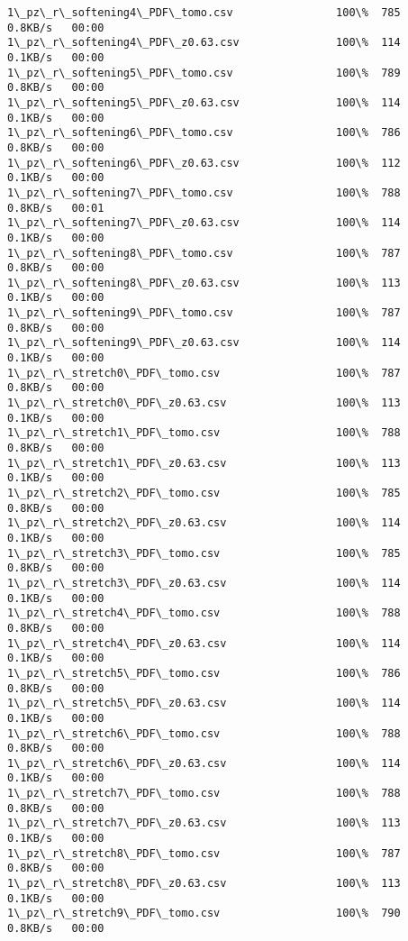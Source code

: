\documentclass[11pt]{article}
\begin{document}
\begin{Verbatim}[commandchars=\\\{\}]
1\_pz\_r\_softening4\_PDF\_tomo.csv                100\%  785     0.8KB/s   00:00    
1\_pz\_r\_softening4\_PDF\_z0.63.csv               100\%  114     0.1KB/s   00:00    
1\_pz\_r\_softening5\_PDF\_tomo.csv                100\%  789     0.8KB/s   00:00    
1\_pz\_r\_softening5\_PDF\_z0.63.csv               100\%  114     0.1KB/s   00:00    
1\_pz\_r\_softening6\_PDF\_tomo.csv                100\%  786     0.8KB/s   00:00    
1\_pz\_r\_softening6\_PDF\_z0.63.csv               100\%  112     0.1KB/s   00:00    
1\_pz\_r\_softening7\_PDF\_tomo.csv                100\%  788     0.8KB/s   00:01    
1\_pz\_r\_softening7\_PDF\_z0.63.csv               100\%  114     0.1KB/s   00:00    
1\_pz\_r\_softening8\_PDF\_tomo.csv                100\%  787     0.8KB/s   00:00    
1\_pz\_r\_softening8\_PDF\_z0.63.csv               100\%  113     0.1KB/s   00:00    
1\_pz\_r\_softening9\_PDF\_tomo.csv                100\%  787     0.8KB/s   00:00    
1\_pz\_r\_softening9\_PDF\_z0.63.csv               100\%  114     0.1KB/s   00:00    
1\_pz\_r\_stretch0\_PDF\_tomo.csv                  100\%  787     0.8KB/s   00:00    
1\_pz\_r\_stretch0\_PDF\_z0.63.csv                 100\%  113     0.1KB/s   00:00    
1\_pz\_r\_stretch1\_PDF\_tomo.csv                  100\%  788     0.8KB/s   00:00    
1\_pz\_r\_stretch1\_PDF\_z0.63.csv                 100\%  113     0.1KB/s   00:00    
1\_pz\_r\_stretch2\_PDF\_tomo.csv                  100\%  785     0.8KB/s   00:00    
1\_pz\_r\_stretch2\_PDF\_z0.63.csv                 100\%  114     0.1KB/s   00:00    
1\_pz\_r\_stretch3\_PDF\_tomo.csv                  100\%  785     0.8KB/s   00:00    
1\_pz\_r\_stretch3\_PDF\_z0.63.csv                 100\%  114     0.1KB/s   00:00    
1\_pz\_r\_stretch4\_PDF\_tomo.csv                  100\%  788     0.8KB/s   00:00    
1\_pz\_r\_stretch4\_PDF\_z0.63.csv                 100\%  114     0.1KB/s   00:00    
1\_pz\_r\_stretch5\_PDF\_tomo.csv                  100\%  786     0.8KB/s   00:00    
1\_pz\_r\_stretch5\_PDF\_z0.63.csv                 100\%  114     0.1KB/s   00:00    
1\_pz\_r\_stretch6\_PDF\_tomo.csv                  100\%  788     0.8KB/s   00:00    
1\_pz\_r\_stretch6\_PDF\_z0.63.csv                 100\%  114     0.1KB/s   00:00    
1\_pz\_r\_stretch7\_PDF\_tomo.csv                  100\%  788     0.8KB/s   00:00    
1\_pz\_r\_stretch7\_PDF\_z0.63.csv                 100\%  113     0.1KB/s   00:00    
1\_pz\_r\_stretch8\_PDF\_tomo.csv                  100\%  787     0.8KB/s   00:00    
1\_pz\_r\_stretch8\_PDF\_z0.63.csv                 100\%  113     0.1KB/s   00:00    
1\_pz\_r\_stretch9\_PDF\_tomo.csv                  100\%  790     0.8KB/s   00:00    

\end{Verbatim}
\end{document}
